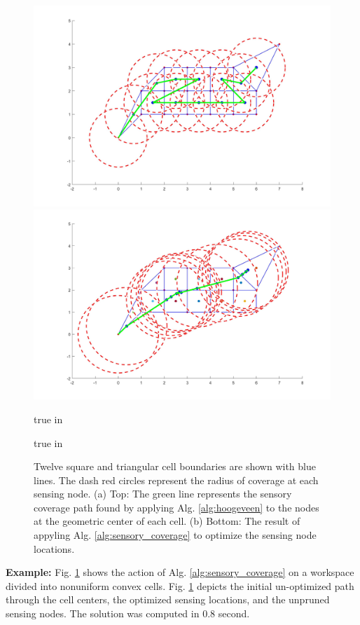 \documentclass[letterpaper, 10 pt, conference]{ieeeconf}
\theoremstyle{definition}
\begin{document}
\begin{figure}[h]
  \centerline{\includegraphics[height=1.6 true in]{Complete_Pre.jpg}}
  \centerline{\includegraphics[height=1.6 true in]{Complete_Post.jpg}}
     true in
    \caption{Twelve square and triangular cell boundaries are shown with blue lines.  The dash red
      circles represent the radius of coverage at each sensing node.  (a) Top: The green line
      represents the sensory coverage path found by applying Alg. \ref{alg:hoogeveen} to the nodes at the geometric
      center of each cell. (b) Bottom: The result of appyling
      Alg. \ref{alg:sensory_coverage} to optimize the sensing node locations.}
  \label{fig:complete_example}
   true in
\end{figure}
\vspace{1mm}
%
{\bf Example:}  Fig. \ref{fig:complete_example} shows the action of Alg. \ref{alg:sensory_coverage} on a workspace divided into nonuniform convex cells.  Fig. \ref{fig:complete_example} depicts the initial un-optimized path through the cell centers, the optimized sensing locations, and the unpruned sensing nodes.  The solution  was computed in 0.8 second. \vspace{-1mm}
\end{document}
